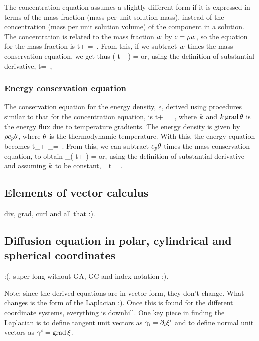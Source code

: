 The concentration equation assumes a slightly different form if it is expressed in terms of the mass fraction (mass per unit solution mass), instead of the concentration (mass per unit solution volume) of the component in a solution. The concentration is related to the mass fraction $w$ by $c = \rho w$, so the equation for the mass fraction is
\beq
\ipd t\dens\mfrac + \gder\iprod\dens\mfrac\conc = \kdiff\lap\dens\mfrac\,.
\eeq
From this, if we subtract $w$ times the mass conservation equation, we get thus
\beq
\dens\left( \ipd t\mfrac + \vel\iprod\gder\mfrac \right) = \kdiff\lap\dens\mfrac
\eeq
or, using the definition of substantial derivative,
\beq
\dens\iod t\mfrac = \kdiff\lap\dens\mfrac\,,
\eeq


\subsubsection{Energy conservation equation}
The conservation equation for the energy density, $\epsilon$, derived using procedures similar to that for the concentration equation, is
\beq
\ipd t\thendens + \gder\iprod\thendens\vel = \gder\iprod\kthcond\grad\temp\,,
\eeq
where $k$ and $k\operatorname{grad}\theta$ is the energy flux due to temperature gradients. The energy density is given by $\rho c_p\theta$, where $\theta$ is the thermodynamic temperature. With this, the energy equation becomes
\beq
\ipd t\dens\kshcap_\press\temp + \gder\iprod\dens\kshcap_\press\temp\vel = \gder\iprod\kthcond\grad\temp\,.
\eeq
From this, we can subtract $c_p\theta$ times the mass conservation equation, to obtain
\beq
\dens\kshcap_\press\left( \ipd t\temp + \vel\iprod\gder\temp \right)
=
\gder\iprod\kdiff\gder\temp
\eeq
or, using the definition of substantial derivative and assuming $k$ to be constant,
\beq
\dens\kshcap_\press\iod t\temp = \kdiff\lap\temp\,.
\eeq


\subsection{Elements of vector calculus}
div, grad, curl and all that :).


\subsection{Diffusion equation in polar, cylindrical and spherical coordinates}
:(, super long without GA, GC and index notation :).

Note: since the derived equations are in vector form, they don't change. What changes is the form of the Laplacian :). Once this is found for the different coordinate systems, everything is downhill. One key piece in finding the Laplacian is to define tangent unit vectors as $\gamma_{i} = \partial_{i}{\xi}^{i}$ and to define normal unit vectors as $\gamma^{i} = \operatorname{grad}\xi$.
